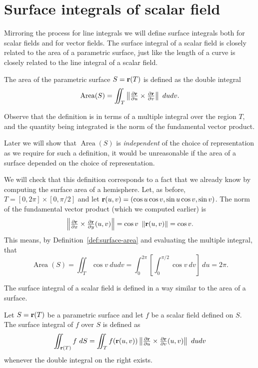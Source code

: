 \section{Surface integrals of scalar field}

Mirroring the process for line integrals we will define surface integrals both for scalar fields and for vector fields.
The surface integral of a scalar field is closely related to the area of a parametric surface, just like the length of a curve is closely related to the line integral of a scalar field.

\begin{definition}%
    \label{def:surface-area}
    The area of the parametric surface \(S = \mathbf{r}(T)\) is defined as the double integral
    \[
        \operatorname{Area}(S) = \iint_{T} \left\|\tfrac{\partial \mathbf{r}}{\partial u} \times \tfrac{\partial \mathbf{r}}{\partial v}\right\| \ du dv.
    \]
\end{definition}

Observe that the definition is in terms of a multiple integral over the region \(T\), and the quantity being integrated is the norm of the fundamental vector product.

Later we will show that \(\operatorname{Area}(S)\) is \emph{independent} of the choice of representation as we require for such a definition, it would be unreasonable if the area of a surface depended on the choice of representation.

We will check that this definition corresponds to a fact that we already know by computing the surface area of a hemisphere.
Let, as before, \( T = [0,2\pi]\times [0,\pi/2]\)
and let \(\mathbf{r}(u,v) = (\cos u \cos v, \sin u \cos v, \sin v)\).
The norm of the fundamental vector product (which we computed earlier) is
\[
    \left\|\tfrac{\partial \mathbf{r}}{\partial x} \times \tfrac{\partial \mathbf{r}}{\partial y}(u,v)\right\|
    = \cos v \  \left\|\mathbf{r}(u,v)\right\| = {\cos v}.
\]
This means, by Definition~\ref{def:surface-area} and evaluating the multiple integral, that
\[
    \operatorname{Area}(S)= \iint_{T} \cos v \ du dv
    = \int_{0}^{2\pi} \left[\int_{0}^{\pi/2} {\cos v} \ dv \right] \ du = {2\pi}.
\]


The surface integral of a scalar field is defined in a way similar to the area of a surface.

\begin{definition}%
    \label{def:surf-int-scalar}
    Let \(S = \mathbf{r}(T)\) be a parametric surface and let \(f\) be a scalar field defined on \(S\).
    The surface integral of \(f\) over \(S\) is defined as
    \[
        \iint_{\mathbf{r}(T)} f \ dS
        = \iint_{T} f(\mathbf{r}(u,v))  \left\|\tfrac{\partial \mathbf{r}}{\partial u} \times \tfrac{\partial \mathbf{r}}{\partial v}(u,v)\right\| \ du dv
    \]
    whenever the double integral on the right exists.
\end{definition}

